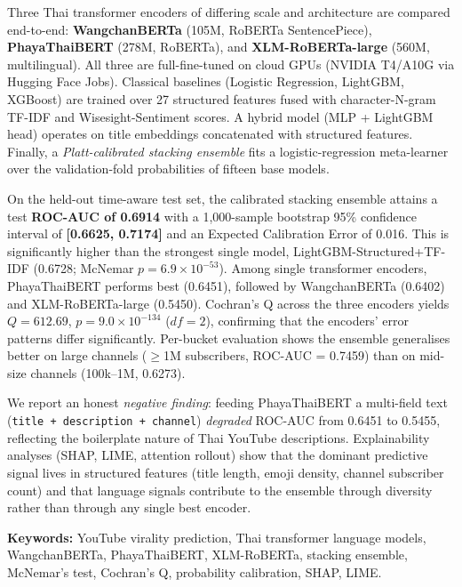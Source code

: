 Three Thai transformer encoders of differing scale and architecture are
compared end-to-end: \textbf{WangchanBERTa} (105M, RoBERTa SentencePiece),
\textbf{PhayaThaiBERT} (278M, RoBERTa), and \textbf{XLM-RoBERTa-large}
(560M, multilingual). All three are full-fine-tuned on cloud GPUs (NVIDIA
T4/A10G via Hugging Face Jobs). Classical baselines (Logistic Regression,
LightGBM, XGBoost) are trained over 27 structured features fused with
character-N-gram TF-IDF and Wisesight-Sentiment scores. A hybrid model
(MLP + LightGBM head) operates on title embeddings concatenated with
structured features. Finally, a \emph{Platt-calibrated stacking ensemble}
fits a logistic-regression meta-learner over the validation-fold
probabilities of fifteen base models.

On the held-out time-aware test set, the calibrated stacking ensemble
attains a test \textbf{ROC-AUC of 0.6914} with a 1{,}000-sample bootstrap
95\% confidence interval of \textbf{[0.6625, 0.7174]} and an Expected
Calibration Error of 0.016. This is significantly higher than the strongest
single model, LightGBM-Structured+TF-IDF (0.6728; McNemar
$p = 6.9\!\times\!10^{-53}$). Among single transformer encoders, PhayaThaiBERT
performs best (0.6451), followed by WangchanBERTa (0.6402) and
XLM-RoBERTa-large (0.5450). Cochran's Q across the three encoders yields
$Q = 612.69$, $p = 9.0\!\times\!10^{-134}$ ($df = 2$), confirming that the
encoders' error patterns differ significantly. Per-bucket evaluation shows
the ensemble generalises better on large channels ($\geq$1M subscribers,
ROC-AUC = 0.7459) than on mid-size channels (100k--1M, 0.6273).

We report an honest \emph{negative finding}: feeding PhayaThaiBERT a
multi-field text (\texttt{title + description + channel}) \emph{degraded}
ROC-AUC from 0.6451 to 0.5455, reflecting the boilerplate nature of Thai
YouTube descriptions. Explainability analyses (SHAP, LIME, attention
rollout) show that the dominant predictive signal lives in structured
features (title length, emoji density, channel subscriber count) and that
language signals contribute to the ensemble through diversity rather than
through any single best encoder.

\noindent\textbf{Keywords:} YouTube virality prediction, Thai transformer
language models, WangchanBERTa, PhayaThaiBERT, XLM-RoBERTa, stacking
ensemble, McNemar's test, Cochran's Q, probability calibration, SHAP, LIME.

\newpage
